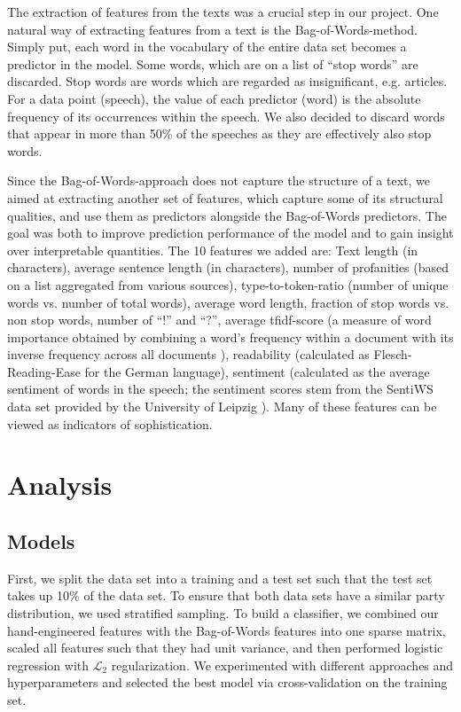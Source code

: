 \documentclass{article}
\begin{document}
The extraction of features from the texts was a crucial step in our project. One natural way of extracting features from a text is the Bag-of-Words-method. Simply put, each word in the vocabulary of the entire data set becomes a predictor in the model. Some words, which are on a list of “stop words” are discarded. Stop words are words which are regarded as insignificant, e.g. articles. For a data point (speech), the value of each predictor (word) is the absolute frequency of its occurrences within the speech. We also decided to discard words that appear in more than 50\% of the speeches as they are effectively also stop words.

Since the Bag-of-Words-approach does not capture the structure of a text, we aimed at extracting another set of features, which capture some of its structural qualities, and use them as predictors alongside the Bag-of-Words predictors. The goal was both to improve prediction performance of the model and to gain insight over interpretable quantities. The 10 features we added are: Text length (in characters), average sentence length (in characters), number of profanities (based on a list aggregated from various sources), type-to-token-ratio (number of unique words vs. number of total words), average word length, fraction of stop words vs. non stop words, number of “!” and “?”, average tfidf-score (a measure of word importance obtained by combining a word's frequency within a document with its inverse frequency across all documents \cite{jonesStatisticalInterpretationTerm1972}), readability (calculated as Flesch-Reading-Ease for the German language), sentiment (calculated as the average sentiment of words in the speech; the sentiment scores stem from the SentiWS data set provided by the University of Leipzig \cite{remquahey2010}). Many of these features can be viewed as indicators of sophistication.

\section{Analysis}
\subsection{Models}
First, we split the data set into a training and a test set such that the test set takes up 10\% of the data set. To ensure that both data sets have a similar party distribution, we used stratified sampling. To build a classifier, we combined our hand-engineered features with the Bag-of-Words features into one sparse matrix, scaled all features such that they had unit variance, and then performed logistic regression with $\mathcal{L}_2$ regularization. We experimented with different approaches and hyperparameters and selected the best model via cross-validation on the training set.
\end{document}
